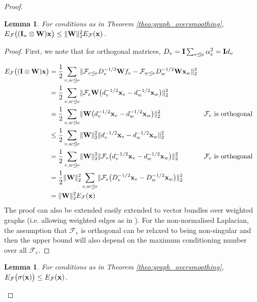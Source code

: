 \documentclass{article}
\newtheorem{lemma}[theorem]{Lemma}
\def\vx{{\bf{x}}}
\def\mI{{\bf{I}}}
\def\mW{{\bf{W}}}
\def\gF{{\mathcal{F}}}
\newcommand{\tleq}{\trianglelefteq}
\DeclarePairedDelimiter{\norm}{\lVert}{\rVert}
\begin{document}
\begin{proof}
\begin{lemma}\label{lemma:left_weight_energy_decrease}
For conditions as in Theorem \ref{theo:graph_oversmoothing}, $E_\gF\big((\mI_n \otimes \mW) \vx\big) \leq  \norm{\mW}^2_2 E_\gF(\vx)$. 
\end{lemma}
\begin{proof}
First, we note that for orthogonal matrices, $D_v = \mI \sum_{v \tleq e} \alpha_e^2 = \mI d_v$ \citep[Lemma 4.4]{hansen2019toward}

\begin{align}
E_\gF\big((\mI \otimes \mW) \vx\big) &= \frac{1}{2} \sum_{v,w \tleq e} \norm{\gF_{v \tleq e} D_v^{-1/2} \mW f_v - \gF_{w \tleq e} D_w^{-1/2}\mW \vx_w}_2^2 \\
&= \frac{1}{2} \sum_{v,w \tleq e} \norm{\gF_{e}  \mW \big(d_v^{-1/2} \vx_v - d_w^{-1/2} \vx_w \big)}_2^2 \\
&= \frac{1}{2} \sum_{v,w \tleq e} \norm{\mW \big(d_v^{-1/2} \vx_v - d_w^{-1/2} \vx_w \big)}_2^2 && \gF_e \text{ is orthogonal} \\
&\leq \frac{1}{2} \sum_{v,w \tleq e} \norm{\mW}^2_2 \norm{d_v^{-1/2} \vx_v - d_w^{-1/2} \vx_w }_2^2  \\
&= \frac{1}{2} \sum_{v,w \tleq e} \norm{\mW}^2_2 \norm{\gF_e \big(d_v^{-1/2} \vx_v - d_w^{-1/2} \vx_w \big)}_2^2 && \gF_e \text{ is orthogonal} \\
&= \frac{1}{2} \norm{\mW}^2_2 \sum_{v,w \tleq e} \norm{\gF_e \big(D_v^{-1/2} \vx_v - D_w^{-1/2} \vx_w \big)}_2^2 \\
&= \norm{\mW}^2_2 E_\gF(\vx) 
\end{align}
The proof can also be extended easily extended to vector bundles over weighted graphs (i.e. allowing weighted edges as in \citet{hansen2019toward}). For the non-normalised Laplacian, the assumption that $\gF_e$ is orthogonal can be relaxed to being non-singular and then the upper bound will also depend on the maximum conditioning number over all $\gF_e$. 
\end{proof}

\begin{lemma}\label{lemma:activation_energy_decrease}
For conditions as in Theorem \ref{theo:graph_oversmoothing}, $E_\gF\big(\sigma(\vx)\big) \leq E_\gF(\vx)$.
\end{lemma}


\end{proof}
\end{document}
